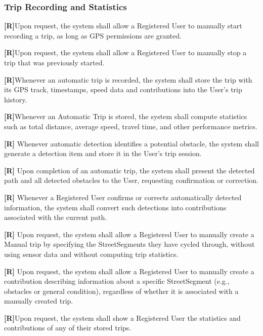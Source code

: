 \subsubsection*{Trip Recording and Statistics}
\item \textbf{[R\creq]}Upon request, the system shall allow a Registered User to manually start recording a trip, as long as GPS permissions are granted.

\item \textbf{[R\creq]}Upon request, the system shall allow a Registered User to manually stop a trip that was previously started.

\item \textbf{[R\creq]}Whenever an automatic trip is recorded, the system shall store the trip with its GPS track, timestamps, speed data and contributions into the User’s trip history.

\item \textbf{[R\creq]}Whenever an Automatic Trip is stored, the system shall compute statistics such as total distance, average speed, travel time, and other performance metrics.

\textbf{[R\creq]} Whenever automatic detection identifies a potential obstacle, the system shall generate a detection item and store it in the User’s trip session.

\textbf{[R\creq]} Upon completion of an automatic trip, the system shall present the detected path and all detected obstacles to the User, requesting confirmation or correction.

\textbf{[R\creq]} Whenever a Registered User confirms or corrects automatically detected information, the system shall convert such detections into contributions associated with the current path.


\textbf{[R\creq]} Upon request, the system shall allow a Registered User to manually create a Manual trip by specifying the StreetSegments they have cycled through, without using sensor data and without computing trip statistics.

\textbf{[R\creq]} Upon request, the system shall allow a Registered User to manually create a contribution describing information about a specific StreetSegment (e.g., obstacles or general condition), regardless of whether it is associated with a manually created trip.





\item \textbf{[R\creq]}Upon request, the system shall show a Registered User the statistics and contributions of any of their stored trips.



